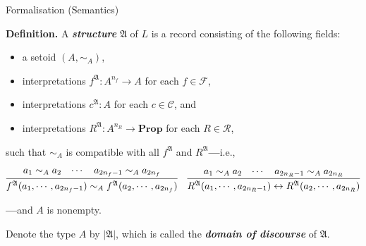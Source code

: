 \documentclass[serif,table,10pt]{beamer}
\newcommand{\0}{\texttt{0}}
\newcommand{\1}{\texttt{1}}
\newcommand{\inlinedef}[1]{\emph{\textbf{#1}}}
\newcommand{\Prop}{\mathbf{Prop}}
\begin{document}
\begin{frame}{Formalisation (Semantics)}

    \textbf{Definition.}
    A \inlinedef{structure} $\mathfrak{A}$ of $L$ is a record consisting of the following fields:
    \begin{itemize}
        \item a setoid $( A , \sim_A )$,
        \item interpretations $ f^\mathfrak{A} : A^{n_f} \to A $ for each $f \in \mathcal{F}$,
        \item interpretations $ c^\mathfrak{A} : A $ for each $c \in \mathcal{C}$, and
        \item interpretations $ R^\mathfrak{A} : A^{n_R} \to \Prop $ for each $R \in \mathcal{R}$,
    \end{itemize}
    such that $\sim_A$ is compatible with all $f^\mathfrak{A}$ and $R^\mathfrak{A}$\textbf{---}i.e.,
    \begin{center} \small
        $ \infer{f^\mathfrak{A} (a_1 , \cdots , a_{2 n_f - 1}) \sim_A f^\mathfrak{A} (a_2 , \cdots , a_{2 n_f} )}{a_1 \sim_A a_2 & \cdots & a_{2 n_f - 1} \sim_A a_{2 n_f}} \quad \infer{R^\mathfrak{A} (a_1 , \cdots , a_{2 n_R - 1}) \leftrightarrow R^\mathfrak{A} (a_2 , \cdots , a_{2 n_R} )}{a_1 \sim_A a_2 & \cdots & a_{2 n_R - 1} \sim_A a_{2 n_R}} $
    \end{center}
    \textbf{---}and $A$ is nonempty.

    Denote the type $A$ by $| \mathfrak{A} |$, which is called the \inlinedef{domain of discourse} of $\mathfrak{A}$.

\end{frame}
\end{document}
